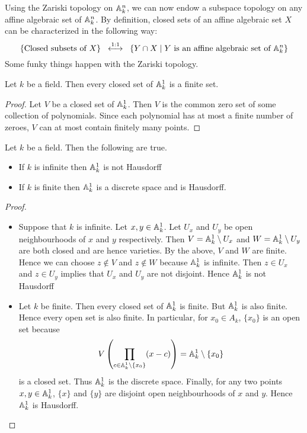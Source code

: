 \documentclass[a4paper]{article}
\begin{document}
Using the Zariski topology on $\mathbb{A}_k^n$, we can now endow a subspace topology on any affine algebraic set of $\mathbb{A}_k^n$. By definition, closed sets of an affine algebraic set $X$ can be characterized in the following way: $$\left\{\text{Closed subsets of }X\right\}\;\;\overset{1:1}{\longleftrightarrow}\;\;\left\{Y\cap X\;|\; Y\text{ is an affine algebraic set of }\mathbb{A}_k^n\right\}$$ Some funky things happen with the Zariski topology. 

\begin{lmm}{}{} Let $k$ be a field. Then every closed set of $\mathbb{A}_k^1$ is a finite set. \tcbline
\begin{proof}
Let $V$ be a closed set of $\mathbb{A}_k^1$. Then $V$ is the common zero set of some collection of polynomials. Since each polynomial has at most a finite number of zeroes, $V$ can at most contain finitely many points. 
\end{proof}
\end{lmm}

\begin{eg}{}{} Let $k$ be a field. Then the following are true. 
\begin{itemize}
\item If $k$ is infinite then $\mathbb{A}_k^1$ is not Hausdorff
\item If $k$ is finite then $\mathbb{A}_k^1$ is a discrete space and is Hausdorff. 
\end{itemize} \tcbline
\begin{proof}~\\
\begin{itemize}
\item Suppose that $k$ is infinite. Let $x,y\in\mathbb{A}_k^1$. Let $U_x$ and $U_y$ be open neighbourhoods of $x$ and $y$ respectively. Then $V=\mathbb{A}_k^1\setminus U_x$ and $W=\mathbb{A}_k^1\setminus U_y$ are both closed and are hence varieties. By the above, $V$ and $W$ are finite. Hence we can choose $z\notin V$ and $z\notin W$ because $\mathbb{A}_k^1$ is infinite. Then $z\in U_x$ and $z\in U_y$ implies that $U_x$ and $U_y$ are not disjoint. Hence $\mathbb{A}_k^1$ is not Hausdorff
\item Let $k$ be finite. Then every closed set of $\mathbb{A}_k^1$ is finite. But $\mathbb{A}_k^1$ is also finite. Hence every open set is also finite. In particular, for $x_0\in A_k$, $\{x_0\}$ is an open set because $$V\left(\prod_{c\in\mathbb{A}_k^1\setminus\{x_0\}}(x-c)\right)=\mathbb{A}_k^1\setminus\{x_0\}$$ is a closed set. Thus $\mathbb{A}_k^1$ is the discrete space. Finally, for any two points $x,y\in\mathbb{A}_k^1$, $\{x\}$ and $\{y\}$ are disjoint open neighbourhoods of $x$ and $y$. Hence $\mathbb{A}_k^1$ is Hausdorff. 
\end{itemize}
\end{proof}
\end{eg}
\end{document}
